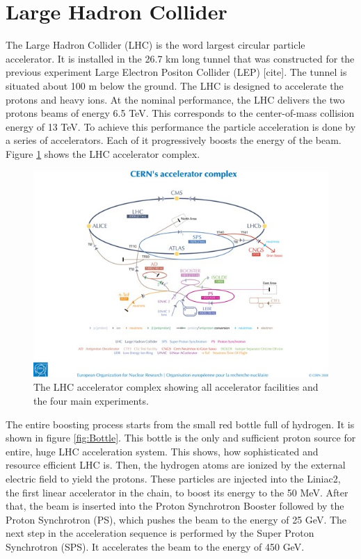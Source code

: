 \section{Large Hadron Collider}
The Large Hadron Collider (LHC) is the word largest circular particle accelerator. It is installed in the 26.7 km long tunnel that was constructed for the previous experiment Large Electron Positon Collider (LEP) [cite]. The tunnel is situated about 100 m below the ground. 
The LHC is designed to accelerate the protons and heavy ions. At the nominal performance, the LHC delivers the two protons beams of energy 6.5 TeV.  This corresponds to the center-of-mass collision energy of 13 TeV. 
To achieve this performance the particle acceleration is done by a series of accelerators. Each of it progressively boosts the energy of the beam. Figure \ref{fig:LHC} shows the LHC accelerator complex. 

\begin{figure}
\centering
\includegraphics{figures/LHC.jpg}
\caption{The LHC accelerator complex showing all accelerator facilities and the four main experiments.
\label{fig:LHC}}
\end{figure}

The entire boosting process starts from the small red bottle full of hydrogen. It is shown in figure \ref{fig:Bottle}. This bottle is the only and sufficient proton source for entire, huge LHC acceleration system. This shows, how sophisticated and resource efficient LHC is. Then, the hydrogen atoms are ionized by the external electric field to yield the protons. These particles are injected into the Liniac2, the first linear accelerator in the chain, to boost its energy to the 50 MeV. After that, the beam is inserted into the Proton Synchrotron Booster followed by the Proton Synchrotron (PS), which pushes the beam to the energy of 25 GeV. The next step in the acceleration sequence is performed by the Super Proton Synchrotron (SPS). It accelerates the beam to the energy of 450 GeV. 

